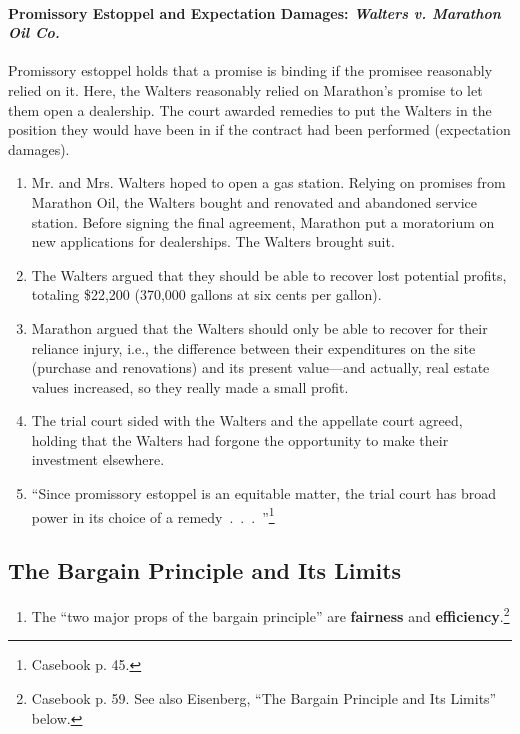 \paragraph{Promissory Estoppel and Expectation Damages: \emph{Walters v. 
Marathon Oil Co.}}

Promissory estoppel holds that a promise is binding if the promisee reasonably 
relied on it. Here, the Walters reasonably relied on Marathon's promise to let 
them open a dealership. The court awarded remedies to put the Walters in the 
position they would have been in if the contract had been performed 
(expectation damages).

\begin{enumerate}
    \item Mr. and Mrs. Walters hoped to open a gas station. Relying on 
    promises from Marathon Oil, the Walters bought and renovated and abandoned 
    service station. Before signing the final agreement, Marathon put a 
    moratorium on new applications for dealerships. The Walters brought suit.
    \item The Walters argued that they should be able to recover lost 
    potential profits, totaling \$22,200 (370,000 gallons at six cents per 
    gallon).
    \item Marathon argued that the Walters should only be able to recover for 
    their reliance injury, i.e., the difference between their expenditures on 
    the site (purchase and renovations) and its present value---and actually, 
    real estate values increased, so they really made a small profit.
    \item The trial court sided with the Walters and the appellate court 
    agreed, holding that the Walters had forgone the opportunity to make their 
    investment elsewhere.
    \item ``Since promissory estoppel is an equitable matter, the trial court 
    has broad power in its choice of a remedy~.~.~.~''\footnote{Casebook p. 
    45.}
\end{enumerate}

\subsection{The Bargain Principle and Its Limits}

\begin{enumerate}
    \item The ``two major props of the bargain principle'' are 
    \textbf{fairness} and \textbf{efficiency}.\footnote{Casebook p. 59. See 
    also Eisenberg, ``The Bargain Principle and Its Limits'' below.}
\end{enumerate}


